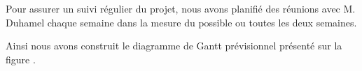 
		Pour assurer un suivi régulier du projet, nous avons planifié des réunions avec M. Duhamel chaque semaine dans la mesure du possible ou toutes les deux semaines.

		Ainsi nous avons construit le diagramme de Gantt prévisionnel présenté sur la figure .
		
